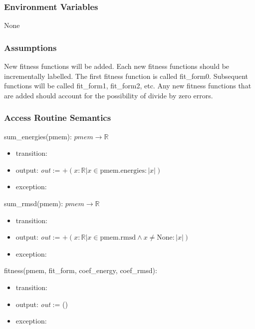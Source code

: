 \documentclass[12pt, titlepage]{article}
\begin{document}
\subsubsection{Environment Variables}

None

\subsubsection{Assumptions}

New fitness functions will be added. Each new fitness functions should be 
incrementally labelled. The first fitness function is called fit\_form0. 
Subsequent functions will be called fit\_form1, fit\_form2, etc. Any new 
fitness functions that are added should account for the possibility of divide 
by zero errors.

\subsubsection{Access Routine Semantics}


\noindent sum\_energies(pmem): $pmem \rightarrow \mathbb{R} $
\begin{itemize}
	\item transition:  
	\item output: \textit{out} := $+(x: \mathbb{R}|x \in \text{pmem.energies}: 
	|x|)$
	\item exception:  
\end{itemize}

\noindent sum\_rmsd(pmem): $pmem \rightarrow \mathbb{R} $
\begin{itemize}
	\item transition:  
	\item output: \textit{out} := $+(x: \mathbb{R}|x \in \text{pmem.rmsd} 
	\wedge 
	x \neq \text{None}
	: |x|)$
	\item exception:  
\end{itemize}

\noindent fitness(pmem, fit\_form, coef\_energy, coef\_rmsd):
\begin{itemize}
	\item transition:  
	
	
	\item output: \textit{out} := ()
	
	
	\item exception:  
\end{itemize}
\end{document}
